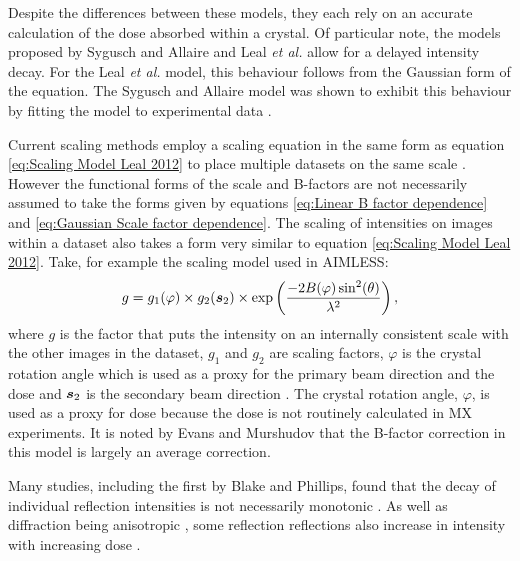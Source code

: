 		Despite the differences between these models, they each rely on an accurate calculation of the dose absorbed within a crystal.
		Of particular note, the models proposed by Sygusch and Allaire and Leal \textit{et al.} allow for a delayed intensity decay.
		For the Leal \textit{et al.} model, this behaviour follows from the Gaussian form of the equation.
		The Sygusch and Allaire model was shown to exhibit this behaviour by fitting the model to experimental data \cite{owen2014}.

		Current scaling methods employ a scaling equation in the same form as equation \ref{eq:Scaling Model Leal 2012} to place multiple datasets on the same scale \cite{kabsch2010integration}.
        However the functional forms of the scale and B-factors are not necessarily assumed to take the forms given by equations \ref{eq:Linear B factor dependence} and \ref{eq:Gaussian Scale factor dependence}.
		The scaling of intensities on images within a dataset also takes a form very similar to equation \ref{eq:Scaling Model Leal 2012}. Take, for example the scaling model used in AIMLESS:
        \begin{equation}
            g = g_1(\varphi) \times g_2(\boldsymbol{s}_2) \times \exp \left(\frac{-2B(\varphi)\sin^2(\theta)}{\lambda^2} \right),
        \end{equation}
		where $g$ is the factor that puts the intensity on an internally consistent scale with the other images in the dataset, $g_1$ and $g_2$ are scaling factors, $\varphi$ is the crystal rotation angle which is used as a proxy for the primary beam direction and the dose and $\boldsymbol{s}_2$ is the secondary beam direction \cite{evans2013}.
		The crystal rotation angle, $\varphi$, is used as a proxy for dose because the dose is not routinely calculated in MX experiments. It is noted by Evans and Murshudov that the B-factor correction in this model is largely an average correction.

		Many studies, including the first by Blake and Phillips, found that the decay of individual reflection intensities is not necessarily monotonic \cite{blake1962,hendrickson1973,hendrickson1976}.
		As well as diffraction being anisotropic \cite{abrahams1987anisotropy}, some reflection reflections also increase in intensity with increasing dose \cite{abrahams1973}.

